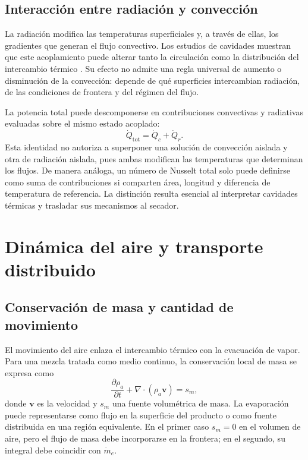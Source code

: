 \subsection{Interacción entre radiación y convección}

La radiación modifica las temperaturas superficiales y, a través de ellas, los gradientes que generan el flujo convectivo. Los estudios de cavidades muestran que este acoplamiento puede alterar tanto la circulación como la distribución del intercambio térmico \cite{balaji1993}. Su efecto no admite una regla universal de aumento o disminución de la convección: depende de qué superficies intercambian radiación, de las condiciones de frontera y del régimen del flujo.

La potencia total puede descomponerse en contribuciones convectivas y radiativas evaluadas sobre el mismo estado acoplado:
\begin{equation}
\dot Q_{\mathrm{tot}}=\dot Q_c+\dot Q_r.
\label{eq:qtotal}
\end{equation}
Esta identidad no autoriza a superponer una solución de convección aislada y otra de radiación aislada, pues ambas modifican las temperaturas que determinan los flujos. De manera análoga, un número de Nusselt total solo puede definirse como suma de contribuciones si comparten área, longitud y diferencia de temperatura de referencia. La distinción resulta esencial al interpretar cavidades térmicas y trasladar sus mecanismos al secador.

\section{Dinámica del aire y transporte distribuido}
\label{sec:dinamica_aire}

\subsection{Conservación de masa y cantidad de movimiento}

El movimiento del aire enlaza el intercambio térmico con la evacuación de vapor. Para una mezcla tratada como medio continuo, la conservación local de masa se expresa como
\begin{equation}
\frac{\partial\rho_a}{\partial t}
+\nabla\cdot(\rho_a\mathbf v)=s_m,
\label{eq:continuidad}
\end{equation}
donde $\mathbf v$ es la velocidad y $s_m$ una fuente volumétrica de masa. La evaporación puede representarse como flujo en la superficie del producto o como fuente distribuida en una región equivalente. En el primer caso $s_m=0$ en el volumen de aire, pero el flujo de masa debe incorporarse en la frontera; en el segundo, su integral debe coincidir con $\dot m_e$.

